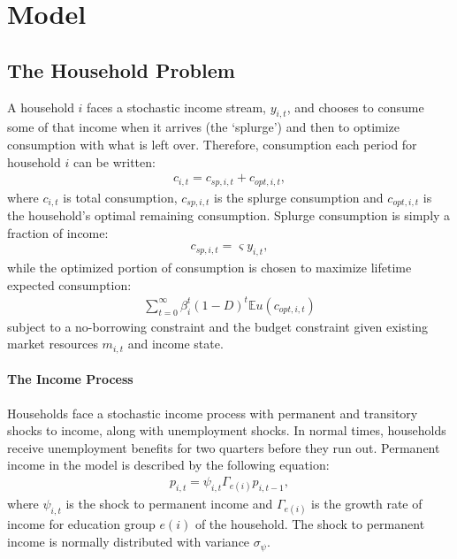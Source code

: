 \documentclass[../HAFiscal]{subfiles}
\begin{document}
	
\section{Model}
	\subsection{The Household Problem}
	A household $i$ faces a stochastic income stream, $y_{i,t}$, and chooses to consume some of that income when it arrives (the `splurge') and then to optimize consumption with what is left over. Therefore, consumption each period for household $i$ can be written:
	\begin{align}
		c_{i,t} = c_{sp,i,t} + c_{opt,i,t},
	\end{align}
	where $c_{i,t}$ is total consumption, $c_{sp,i,t}$ is the splurge consumption and $c_{opt,i,t}$ is the household's optimal remaining consumption. Splurge consumption is simply a fraction of income:
	\begin{align}
	c_{sp,i,t} = \varsigma y_{i,t},
	\end{align}
	while the optimized portion of consumption is chosen to maximize lifetime expected consumption:
	\begin{align}
	\sum_{t=0}^{\infty}\beta_i^t (1-D)^t \mathbb{E}u(c_{opt,i,t})
	\end{align}
	subject to a no-borrowing constraint and the budget constraint given existing market resources $m_{i,t}$ and income state.
	\paragraph{The Income Process}
	Households face a stochastic income process with permanent and transitory shocks to income, along with unemployment shocks. In normal times, households receive unemployment benefits for two quarters before they run out. Permanent income in the model is described by the following equation:
	\begin{align}
	p_{i,t} = \psi_{i,t}\Gamma_{e(i)}p_{i,t-1},
	\end{align}
	where $\psi_{i,t}$ is the shock to permanent income and $\Gamma_{e(i)}$ is the growth rate of income for education group $e(i)$ of the household. The shock to permanent income is normally distributed with variance $\sigma_{\psi}$.
	
\end{document}
